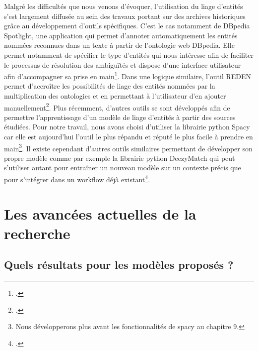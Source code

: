 \documentclass[a4paper,12pt,twoside]{book}
\begin{document}
	Malgré les difficultés que nous venons d'évoquer, l'utilisation du liage d'entités s'est largement diffusée au sein des travaux portant sur des archives historiques grâce au développement d'outils spécifiques. C'est le cas notamment de DBpedia Spotlight, une application qui permet d'annoter automatiquement les entités nommées reconnues dans un texte à partir de l'ontologie web DBpedia. Elle permet notamment de spécifier le type d'entités qui nous intéresse afin de faciliter le processus de résolution des ambiguïtés et dispose d'une interface utilisateur afin d'accompagner sa prise en main\footcite{mendes_dbpedia_2011}. Dans une logique similaire, l'outil REDEN permet d'accroître les possibilités de liage des entités nommées par la multiplication des ontologies et en permettant à l'utilisateur d'en ajouter manuellement\footcite{frontini_domain-adapted_2015}. Plus récemment, d'autres outils se sont développés afin de permettre l'apprentissage d'un modèle de liage d'entités à partir des sources étudiées. Pour notre travail, nous avons choisi d'utiliser la librairie python Spacy car elle est aujourd'hui l'outil le plus répandu et réputé le plus facile à prendre en main\footnote{Nous développerons plus avant les fonctionnalités de spacy au chapitre 9.}. Il existe cependant d'autres outils similaires permettant de développer son propre modèle comme par exemple la librairie python DeezyMatch qui peut s'utiliser autant pour entraîner un nouveau modèle sur un contexte précis que pour s'intégrer dans un workflow déjà existant\footcite{hosseini_deezymatch_2020}.
	
	\section{Les avancées actuelles de la recherche}
	
	\subsection{Quels résultats pour les modèles proposés ?}
	
\end{document}
